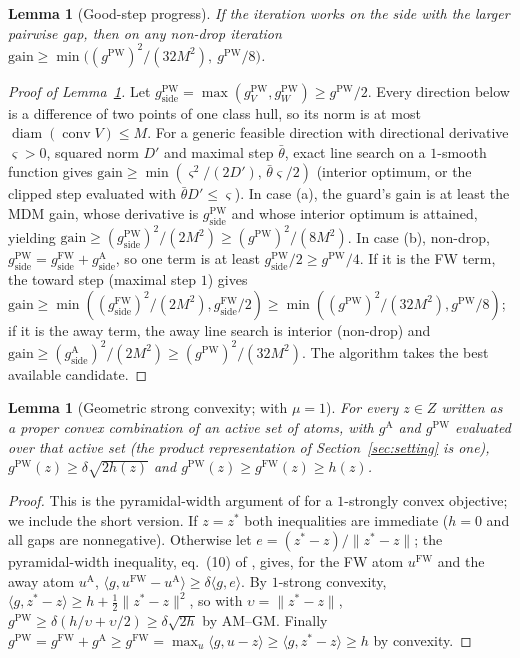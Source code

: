 \documentclass[pdflatex,sn-apa]{sn-jnl}%
\newtheorem{lemma}[theorem]{Lemma}
\theoremstyle{thmstyleone}
\newtheorem{lemma}[theorem]{Lemma}
\theoremstyle{thmstyletwo}
\newcommand{\conv}{\operatorname{conv}}
\newcommand{\ip}[2]{\langle #1, #2 \rangle}
\newcommand{\norm}[1]{\lVert #1 \rVert}
\newcommand{\gFW}{g^{\mathrm{FW}}}
\newcommand{\gA}{g^{\mathrm{A}}}
\newcommand{\gPW}{g^{\mathrm{PW}}}
\begin{document}
\begin{lemma}[Good-step progress]\label{lem:good}
If the iteration works on the side with the larger pairwise gap, then
on any non-drop iteration $\mathrm{gain}\ge\min\!\big((\gPW)^2/(32M^2),\ \gPW/8\big)$.
\end{lemma}
\begin{proof}[Proof of Lemma~\ref{lem:good}]
Let $\gPW_{\text{side}}=\max(\gPW_V,\gPW_W)\ge\gPW/2$. Every direction below is a
difference of two points of one class hull, so its norm is at most
$\operatorname{diam}(\conv V)\le M$. For a generic feasible direction with
directional derivative $\varsigma>0$, squared norm $D'$ and maximal step
$\bar\theta$, exact line search on a $1$-smooth function gives
$\mathrm{gain}\ge\min(\varsigma^2/(2D'),\,\bar\theta\varsigma/2)$ (interior
optimum, or the clipped step evaluated with $\bar\theta D'\le\varsigma$).
In case (a), the guard's gain is at least the MDM gain, whose
derivative is $\gPW_{\text{side}}$ and whose interior optimum is attained, yielding
$\mathrm{gain}\ge(\gPW_{\text{side}})^2/(2M^2)\ge(\gPW)^2/(8M^2)$.
In case (b), non-drop, $\gPW_{\text{side}}=\gFW_{\text{side}}+\gA_{\text{side}}$, so
one term is at least $\gPW_{\text{side}}/2\ge\gPW/4$. If it is the FW term, the toward step
(maximal step $1$) gives
$\mathrm{gain}\ge\min((\gFW_{\text{side}})^2/(2M^2),\gFW_{\text{side}}/2)\ge\min((\gPW)^2/(32M^2),\gPW/8)$;
if it is the away term, the away line search is interior (non-drop) and
$\mathrm{gain}\ge(\gA_{\text{side}})^2/(2M^2)\ge(\gPW)^2/(32M^2)$. The
algorithm takes the best available candidate.
\end{proof}
\begin{lemma}[Geometric strong convexity; {\citealp[Thm.~3]{lj2015}} with
$\mu=1$]\label{lem:gsc}
For every $z\in Z$ written as a proper convex combination of an active
set of atoms, with $\gA$ and $\gPW$ evaluated over that active set (the
product representation of Section~\ref{sec:setting} is one),
$\gPW(z)\ge\delta\sqrt{2h(z)}$ and $\gPW(z)\ge\gFW(z)\ge h(z)$.
\end{lemma}
\begin{proof}
This is the pyramidal-width argument of \citet[Thm.~3]{lj2015} for a
$1$-strongly convex objective; we include the short version. If $z=z^*$ both inequalities are
immediate ($h=0$ and all gaps are nonnegative). Otherwise let
$e=(z^*-z)/\norm{z^*-z}$; the pyramidal-width inequality, eq.~(10) of
\citet{lj2015}, gives, for the FW atom
$u^{\mathrm{FW}}$ and the away atom $u^{\mathrm A}$,
$\ip{g}{u^{\mathrm{FW}}-u^{\mathrm A}}\ge\delta\ip{g}{e}$. By $1$-strong convexity,
$\ip{g}{z^*-z}\ge h+\tfrac12\norm{z^*-z}^2$, so with
$\upsilon=\norm{z^*-z}$,
$\gPW\ge\delta(h/\upsilon+\upsilon/2)\ge\delta\sqrt{2h}$ by AM--GM. Finally
$\gPW=\gFW+\gA\ge\gFW=\max_u\ip{g}{u-z}\ge\ip{g}{z^*-z}\ge h$ by
convexity.
\end{proof}
\end{document}
